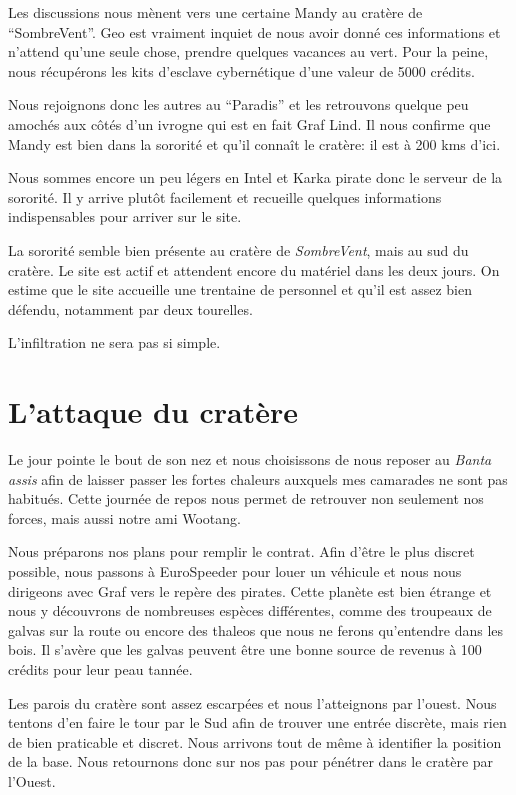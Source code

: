 \documentclass[a4paper,9pt,twoside,twocolumn,openany]{book}
\begin{document}
Les discussions nous mènent vers une certaine Mandy au cratère de “SombreVent”. Geo est vraiment inquiet de nous avoir donné ces informations et n’attend qu’une seule chose, prendre quelques vacances au vert. Pour la peine, nous récupérons les kits d’esclave cybernétique d’une valeur de 5000 crédits.

Nous rejoignons donc les autres au “Paradis” et les retrouvons quelque peu amochés aux côtés d’un ivrogne qui est en fait Graf Lind. Il nous confirme que Mandy est bien dans la sororité et qu’il connaît le cratère: il est à 200 kms d’ici.

Nous sommes encore un peu légers en Intel et Karka pirate donc le serveur de la sororité. Il y arrive plutôt facilement et recueille quelques informations indispensables pour arriver sur le site.

La sororité semble bien présente au cratère de \emph{SombreVent}, mais au sud du cratère. Le site est actif et attendent encore du matériel dans les deux jours. On estime que le site accueille une trentaine de personnel et qu’il est assez bien défendu, notamment par deux tourelles.

L’infiltration ne sera pas si simple.

\section{L’attaque du cratère}
\subtitle{26 novembre 2017}

Le jour pointe le bout de son nez et nous choisissons de nous reposer au \emph{Banta assis} afin de laisser passer les fortes chaleurs auxquels mes camarades ne sont pas habitués. Cette journée de repos nous permet de retrouver non seulement nos forces, mais aussi notre ami Wootang.

Nous préparons nos plans pour remplir le contrat. Afin d’être le plus discret possible, nous passons à EuroSpeeder pour louer un véhicule et nous nous dirigeons avec Graf vers le repère des pirates. Cette planète est bien étrange et nous y découvrons de nombreuses espèces différentes, comme des troupeaux de galvas sur la route ou encore des thaleos que nous ne ferons qu’entendre dans les bois. Il s’avère que les galvas peuvent être une bonne source de revenus à 100 crédits pour leur peau tannée.

Les parois du cratère sont assez escarpées et nous l’atteignons par l’ouest. Nous tentons d’en faire le tour par le Sud afin de trouver une entrée discrète, mais rien de bien praticable et discret. Nous arrivons tout de même à identifier la position de la base. Nous retournons donc sur nos pas pour pénétrer dans le cratère par l’Ouest.
\end{document}
